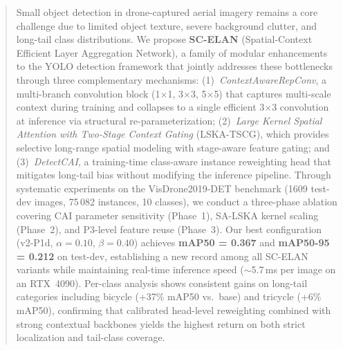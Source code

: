 \begin{abstract}
Small object detection in drone-captured aerial imagery remains a core challenge due to limited object texture, severe background clutter, and long-tail class distributions.
We propose \textbf{SC-ELAN} (Spatial-Context Efficient Layer Aggregation Network), a family of modular enhancements to the YOLO detection framework that jointly addresses these bottlenecks through three complementary mechanisms:
(1)~\textit{ContextAwareRepConv}, a multi-branch convolution block (1$\times$1, 3$\times$3, 5$\times$5) that captures multi-scale context during training and collapses to a single efficient 3$\times$3 convolution at inference via structural re-parameterization;
(2)~\textit{Large Kernel Spatial Attention with Two-Stage Context Gating} (LSKA-TSCG), which provides selective long-range spatial modeling with stage-aware feature gating;
and (3)~\textit{DetectCAI}, a training-time class-aware instance reweighting head that mitigates long-tail bias without modifying the inference pipeline.
Through systematic experiments on the VisDrone2019-DET benchmark (1609 test-dev images, 75\,082 instances, 10 classes), we conduct a three-phase ablation covering CAI parameter sensitivity (Phase~1), SA-LSKA kernel scaling (Phase~2), and P3-level feature reuse (Phase~3).
Our best configuration (v2-P1d, $\alpha{=}0.10$, $\beta{=}0.40$) achieves \textbf{mAP50 = 0.367} and \textbf{mAP50-95 = 0.212} on test-dev, establishing a new record among all SC-ELAN variants while maintaining real-time inference speed ($\sim$5.7\,ms per image on an RTX~4090).
Per-class analysis shows consistent gains on long-tail categories including bicycle (+37\% mAP50 vs.\ base) and tricycle (+6\% mAP50), confirming that calibrated head-level reweighting combined with strong contextual backbones yields the highest return on both strict localization and tail-class coverage.
\end{abstract}
